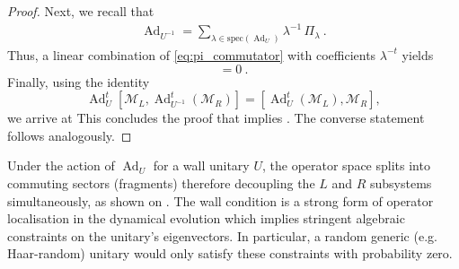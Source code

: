 \documentclass[11pt, twocolumn, floatfix, superscriptaddress, aps, prb, raggedbottom]{revtex4-2}
\DeclareMathOperator{\Ad}{Ad}
\begin{document}
\begin{proof}
Next, we recall that 
\begin{align}\label{eq:spec decomp U-1}
  \Ad_{U^{-1}} = \!\!\sum_{\lambda\in \mathrm{spec}(\Ad_U)}\!\!\!\! 
  \lambda^{-1}\, \Pi_\lambda\ .
\end{align}
Thus, a linear combination of
\eqref{eq:pi_commutator} with coefficients $\lambda^{-t}$ yields
\begin{equation}
  [\mathcal{M}_L, \mathrm{Ad}_{U^{-1}}^t(\mathcal{M}_R)] = 0\ .
\end{equation}
Finally, using the identity
\begin{equation*}
    \Ad_U^t [\mathcal{M}_L, \Ad_{U^{-1}}^t (\mathcal{M}_R)]
    =[\Ad_{U}^t(\mathcal{M}_L),\mathcal{M}_R] ,
\end{equation*}
we arrive at
 This concludes the proof that  implies . The converse statement follows analogously.
\end{proof}

\noindent Under the action of $\Ad_U$ for a wall unitary $U$, the operator space splits into commuting sectors (fragments) therefore decoupling the $L$ and $R$ subsystems simultaneously, as shown on . The wall condition is a strong form of operator localisation in the dynamical evolution which implies stringent algebraic constraints on the unitary's eigenvectors. In particular, a random generic (e.g. Haar-random) unitary would only satisfy these constraints with probability zero. 
\end{document}
